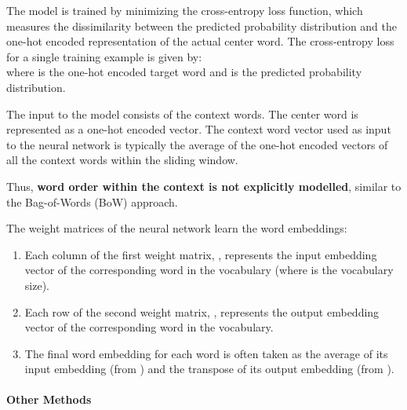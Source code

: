\documentclass[
]{article}
\providecommand{\tightlist}{%
  \setlength{\itemsep}{0pt}\setlength{\parskip}{0pt}}
\begin{document}
The model is trained by minimizing the cross-entropy loss function,
which measures the dissimilarity between the predicted probability
distribution and the one-hot encoded representation of the actual center
word. The cross-entropy loss {} for a single training example is given
by:\\
{}where {} is the one-hot encoded target word and {} is the predicted
probability distribution.

The input to the model consists of the context words. The center word is
represented as a one-hot encoded vector. The context word vector used as
input to the neural network is typically the average of the one-hot
encoded vectors of all the context words within the sliding window.

Thus, \textbf{word order within the context is not explicitly modelled},
similar to the Bag-of-Words (BoW) approach.

The weight matrices of the neural network learn the word embeddings:

\begin{enumerate}
\tightlist
\item
  Each column of the first weight matrix, {}, represents the input
  embedding vector of the corresponding word in the vocabulary (where {}
  is the vocabulary size).
\item
  Each row of the second weight matrix, {}, represents the output
  embedding vector of the corresponding word in the vocabulary.
\item
  The final word embedding for each word is often taken as the average
  of its input embedding (from {}) and the transpose of its output
  embedding (from {}).
\end{enumerate}

\hypertarget{other-methods}{%
\paragraph{Other Methods}\label{other-methods}}
\end{document}

